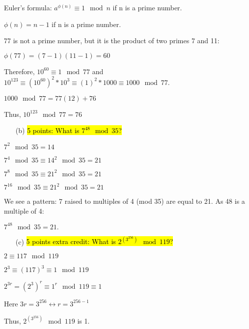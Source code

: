 \documentclass[12pt]{article}
\begin{document}
\item Euler's formula: $a^{\phi(n)} \equiv 1 \mod n$ if n is a prime number.
\item $\phi(n) = n - 1$ if n is a prime number.
\item 77 is not a prime number, but it is the product of two primes 7 and 11: 
\begin{center}
    $\phi(77) = (7-1)(11-1) = 60$
\end{center}
\item Therefore, $10^{60} \equiv 1 \mod 77$ and $10^{123} \equiv (10^{60})^{2} * 10^{3} \equiv (1)^{2} * 1000 \equiv 1000 \mod 77.$
\item $1000 \mod 77 = 77(12) + 76$
\item Thus, $10^{123} \mod 77 = 76$

\begin{enumerate}
\item[(b)] \hl{5 points: What is $7^{48} \mod 35$?}
\end{enumerate}
\item $7^{2} \mod 35 = 14$
\item $7^{4} \mod 35 \equiv 14^2 \mod 35 = 21$
\item $7^{8} \mod 35 \equiv 21^2 \mod 35 = 21$
\item $7^{16} \mod 35 \equiv 21^2 \mod 35 = 21$

\item We see a pattern: 7 raised to multiples of 4 (mod 35) are equal to 21. As 48 is a multiple of 4: \item $7^{48} \mod 35 = 21.$
\begin{enumerate}
\item[(c)] \hl{5 points extra credit: What is $2^{(3^{256})} \mod 119$?}
\end{enumerate}
\item $2 \equiv 117 \mod 119$
\item $2^{3} \equiv (117)^3 \equiv 1 \mod 119$
\item $2^{3r} = (2^3)^r \equiv 1^r \mod 119 \equiv 1$
\item Here $3r = 3^{256} \longleftrightarrow r = 3^{256-1}$
\item Thus, $2^{(3^{256})} \mod 119$ is 1.
\end{document}
